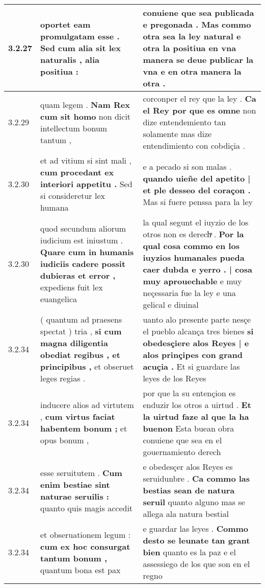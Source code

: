 \begin{tabular}{|p{1cm}|p{6.5cm}|p{6.5cm}|}
3.2.27 & oportet eam promulgatam esse . \textbf{ Sed cum alia sit lex naturalis , } alia positiua : & conuiene que sea publicada e pregonada . \textbf{ Mas commo otra sea la ley natural e otra la positiua en vna manera se deue publicar la vna } e en otra manera la otra . \\\hline
3.2.29 & quam legem . \textbf{ Nam Rex cum sit homo } non dicit intellectum bonum tantum , & corconper el rey que la ley . \textbf{ Ca el Rey por que es omne } non dize entendemiento tan solamente mas dize entendimiento con cobdiçia . \\\hline
3.2.30 & et ad vitium si sint mali , \textbf{ cum procedant ex interiori appetitu . } Sed si consideretur lex humana & e a pecado si son malas . \textbf{ quando uieñe del apetito | et ple desseo del coraçon . } Mas si fuere penssa para la ley \\\hline
3.2.30 & quod secundum aliorum iudicium est iniustum . \textbf{ Quare cum in humanis iudiciis cadere possit dubieras et error , } expediens fuit lex euangelica & la qual segunt el iuyzio de los otros non es derechͣ . \textbf{ Por la qual cosa commo en los iuyzios humanales pueda caer dubda e yerro . | cosa muy aprouechable } e muy neçessaria fue la ley e una gelical e diuinal \\\hline
3.2.34 & ( quantum ad praesens spectat ) tria , \textbf{ si cum magna diligentia obediat regibus , et principibus , } et obseruet leges regias . & uanto alo presente parte nesçe el pueblo alcança tres bienes \textbf{ si obedesçiere alos Reyes | e alos prinçipes con grand acuçia . } Et si guardare las leyes de los Reyes \\\hline
3.2.34 & inducere alios ad virtutem , \textbf{ cum virtus faciat habentem bonum ; } et opus bonum , & por que la su entençion es enduzir los otros a uirtud . \textbf{ Et la uirtud faze al que la ha buenon } Esta buean obra conuiene que sea en el gouernamiento derech \\\hline
3.2.34 & esse seruitutem . \textbf{ Cum enim bestiae sint naturae seruilis : } quanto quis magis accedit & e obedesçer alos Reyes es seruidunbre . \textbf{ Ca commo las bestias sean de natura seruil } quanto alguno mas se allega ala natura bestial \\\hline
3.2.34 & et obseruationem legum : \textbf{ cum ex hoc consurgat tantum bonum , } quantum bona est pax & e guardar las leyes . \textbf{ Commo desto se leunate tan grant bien } quanto es la paz e el assessiego de los que son en el regno \\\hline

\end{tabular}
